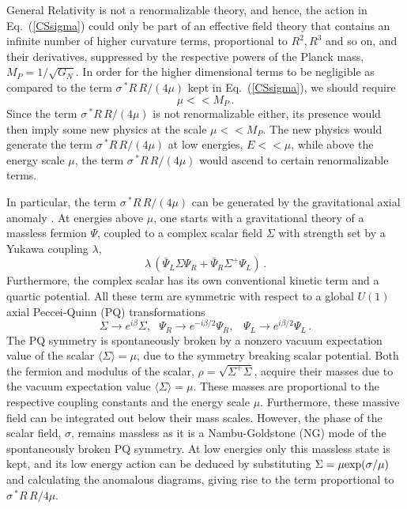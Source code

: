 \documentclass[prd,twocolumn,showpacs,superscriptaddress,nofootinbib]{revtex4-2}
\newcommand\be{\begin{equation}}
\newcommand\ee{\end{equation}}
\newcommand{\pont}{{\,^\ast\!}R\,R}
\begin{document}
General Relativity is not a renormalizable theory, and hence, the action in Eq.~(\ref {CSsigma})  could only be 
part of an effective field theory that contains an infinite number of  higher curvature terms, proportional to $R^2, R^3$ and so on,
and their derivatives, suppressed by the respective 
powers of the Planck mass, $M_P=1/ \sqrt{G_N}$. In order for the  higher dimensional terms 
to be negligible  as compared  to the  term   $\sigma \pont /({4\mu })$ kept in Eq.~(\ref {CSsigma}), 
we should require
\be
\mu << M_P\,.
\ee
Since the term ${\sigma \pont }/({4\mu })$ is not renormalizable either, its presence  would then imply 
some new physics at the scale $\mu <<M_P$.  The new physics would  generate the term
${\sigma \pont }/({4\mu })$ at low energies, $E<<\mu$, while above the energy scale $\mu$, the term 
$\sigma \pont /({4\mu })$  would  ascend to certain renormalizable terms. 

In particular, the  term ${\sigma \pont }/({4\mu })$ can be 
generated by the gravitational axial anomaly \cite{Delbourgo:1972xb}. At energies above $\mu$, 
one starts with a gravitational theory of a massless fermion $\Psi$, 
coupled  to a complex scalar field $\Sigma$ with strength set by a Yukawa 
coupling $\lambda$, 
\be
\lambda\, ({\bar \Psi}_L \Sigma \Psi_R +{\bar \Psi}_R \Sigma^+ \Psi_L) \,.
\label{LR}
\ee
Furthermore, the complex scalar has its own conventional kinetic term 
and a quartic potential. All these term are symmetric with respect to  a global $U(1)$  
axial Peccei-Quinn (PQ) transformations
\be
\Sigma \to e^{i\beta } \Sigma, ~~~
\Psi_R \to e^{-i\beta/2 } \Psi_R, ~~~\, \Psi_L \to e^{i\beta/2 } \Psi_L\,.
\label{PQ}
\ee 
The PQ symmetry  is spontaneously broken by a  nonzero vacuum expectation value of the scalar
 $\langle \Sigma \rangle = \mu $, due to  the symmetry breaking scalar potential.  
Both the fermion and modulus of the scalar, $\rho = \sqrt {\Sigma^+\Sigma}$,  acquire their masses
due to the vacuum expectation value $\langle \Sigma \rangle = \mu $. These masses  
are proportional to the respective coupling 
constants and the energy scale $\mu$. Furthermore, these massive field  can be integrated out  
below their mass scales.  However, the phase of the scalar field, $\sigma$, remains massless  
as it is a Nambu-Goldstone (NG) mode of the spontaneously broken PQ symmetry.  
At low energies  only this massless state is kept, and   its low energy action 
can be deduced by substituting $\Sigma = \mu {\rm exp}{ (\sigma/\mu )}$ and  
calculating the anomalous diagrams, giving rise to the term proportional to ${\sigma \pont }/{4\mu }$.
\end{document}
